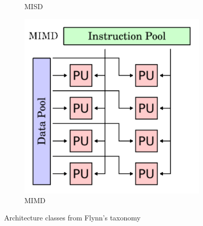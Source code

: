 \documentclass[a4paper, 11pt]{report}
\begin{document}
\begin{figure}[h]
\begin{subfigure}[t]{0.4\textwidth}
		\caption{MISD}\label{fig:misd}
	\end{subfigure}
	\begin{subfigure}[t]{0.4\textwidth}
		\centering
		\includegraphics[scale=.3]{images/mimd.pdf}
		\caption{MIMD}\label{fig:mimd}
	\end{subfigure}
	\caption{Architecture classes from Flynn's taxonomy}\label{fig:archFlynnTax}
\end{figure}
\end{document}
